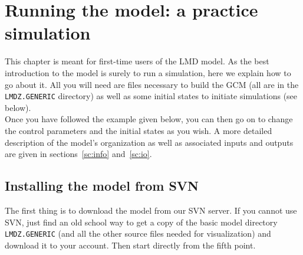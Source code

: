 
\chapter{Running the model: a practice simulation}

\label{loc:contact1}

This chapter is meant for first-time users of the LMD model.
As the best introduction to the model is surely to run a simulation,
here we explain how to go about it.
All you will need are files necessary to build the GCM (all are in
the {\tt LMDZ.GENERIC} directory) as well as some initial states
to initiate simulations (see below).\\
Once you have followed the example given below,
you can then go on to change the control parameters and the initial states
as you wish. A more detailed description of the model's organization
as well as associated inputs and
outputs are given in sections~\ref{sc:info} and~\ref{sc:io}.

\section{Installing the model from SVN}

The first thing is to download the model from our SVN server. If you cannot use SVN, just find an old school way to get a copy of the basic model directory \verb"LMDZ.GENERIC" (and all the other source files needed for visualization) and download it to your account. Then start directly from the fifth point.

